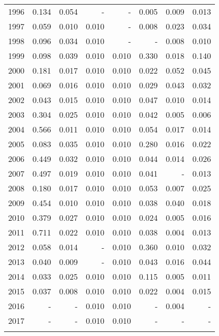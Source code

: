 \begin{longtable}{lrrrrrrr}
  1996 & 0.134 & 0.054 & - & - & 0.005 & 0.009 & 0.013 \\ 
  1997 & 0.059 & 0.010 & 0.010 & - & 0.008 & 0.023 & 0.034 \\ 
  1998 & 0.096 & 0.034 & 0.010 & - & - & 0.008 & 0.010 \\ 
  1999 & 0.098 & 0.039 & 0.010 & 0.010 & 0.330 & 0.018 & 0.140 \\ 
  2000 & 0.181 & 0.017 & 0.010 & 0.010 & 0.022 & 0.052 & 0.045 \\ 
  2001 & 0.069 & 0.016 & 0.010 & 0.010 & 0.029 & 0.043 & 0.032 \\ 
  2002 & 0.043 & 0.015 & 0.010 & 0.010 & 0.047 & 0.010 & 0.014 \\ 
  2003 & 0.304 & 0.025 & 0.010 & 0.010 & 0.042 & 0.005 & 0.006 \\ 
  2004 & 0.566 & 0.011 & 0.010 & 0.010 & 0.054 & 0.017 & 0.014 \\ 
  2005 & 0.083 & 0.035 & 0.010 & 0.010 & 0.280 & 0.016 & 0.022 \\ 
  2006 & 0.449 & 0.032 & 0.010 & 0.010 & 0.044 & 0.014 & 0.026 \\ 
  2007 & 0.497 & 0.019 & 0.010 & 0.010 & 0.041 & - & 0.013 \\ 
  2008 & 0.180 & 0.017 & 0.010 & 0.010 & 0.053 & 0.007 & 0.025 \\ 
  2009 & 0.454 & 0.010 & 0.010 & 0.010 & 0.038 & 0.040 & 0.018 \\ 
  2010 & 0.379 & 0.027 & 0.010 & 0.010 & 0.024 & 0.005 & 0.016 \\ 
  2011 & 0.711 & 0.022 & 0.010 & 0.010 & 0.038 & 0.004 & 0.013 \\ 
  2012 & 0.058 & 0.014 & - & 0.010 & 0.360 & 0.010 & 0.032 \\ 
  2013 & 0.040 & 0.009 & - & 0.010 & 0.043 & 0.016 & 0.044 \\ 
  2014 & 0.033 & 0.025 & 0.010 & 0.010 & 0.115 & 0.005 & 0.011 \\ 
  2015 & 0.037 & 0.008 & 0.010 & 0.010 & 0.022 & 0.004 & 0.015 \\ 
  2016 & - & - & 0.010 & 0.010 & - & 0.004 & - \\ 
  2017 & - & - & 0.010 & 0.010 & - & - & - \\ 
   \hline
\hline
\label{tab:epsilon1}
\end{longtable}
\endgroup
